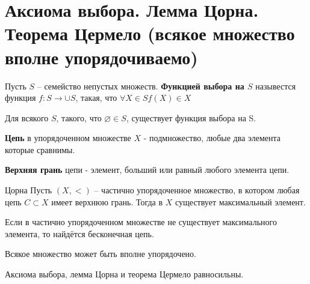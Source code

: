 \section{Аксиома выбора. Лемма Цорна. Теорема Цермело (всякое множество вполне упорядочиваемо)}
\begin{definition}
	Пусть $S$ -- семейство непустых множеств. \textbf{Функцией выбора на $S$} назывестся функция $f: S\to\cup S$,
	такая, что $\forall X\in S f(X)\in X$
\end{definition}
\begin{axiom}[выбора]
	\label{choiceaxiom}
	Для всякого $S$, такого, что $\varnothing\in S$, существует функция выбора на S.
\end{axiom}
\begin{definition}
	\textbf{Цепь} в упорядоченном множестве $X$ - подмножество, любые два элемента которые сравнимы.

	\textbf{Верхняя грань} цепи - элемент, больший или равный любого элемента цепи.
\end{definition}
\begin{lemma}{Цорна}
	\label{zornlemma}
	Пусть $(X,<)$ -- частично упорядоченное множество, в котором любая цепь $C\subset X$ имеет верхнюю грань. Тогда
	в $X$ существует максимальный элемент.
\end{lemma}
\begin{corollary}
	Если в частично упорядоченном множестве не существует максимального элемента, то найдётся бесконечная цепь.
\end{corollary}
\begin{theorem}[Цермело]
	\label{zermelotheorem}
	Всякое множество может быть вполне упорядочено.
\end{theorem}
\begin{theorem}
	Аксиома выбора, лемма Цорна и теорема Цермело равносильны.
\end{theorem}
